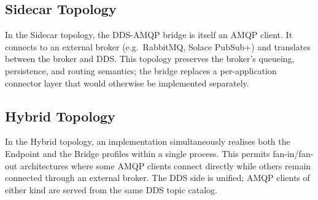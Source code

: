 \documentclass{../styles/zerodds-vendor-spec}
\begin{document}
\subsection{Sidecar Topology}\label{sec:topology-sidecar}

In the Sidecar topology, the DDS-AMQP bridge is itself an AMQP
client. It connects to an external broker (e.g.\ RabbitMQ, Solace
PubSub+) and translates between the broker and DDS. This topology
preserves the broker's queueing, persistence, and routing
semantics; the bridge replaces a per-application connector layer
that would otherwise be implemented separately.

\begin{center}
\end{center}

\subsection{Hybrid Topology}\label{sec:topology-hybrid}

In the Hybrid topology, an implementation simultaneously realises
both the Endpoint and the Bridge profiles within a single process.
This permits fan-in/fan-out architectures where some AMQP clients
connect directly while others remain connected through an external
broker. The DDS side is unified; AMQP clients of either kind are
served from the same DDS topic catalog.
\end{document}
